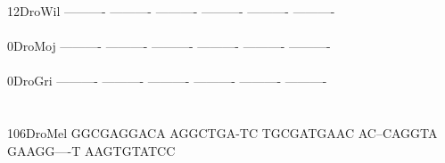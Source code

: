 \documentclass[11pt,twoside,reqno,a4paper]{article}
\begin{document}
{12\hspace*{3\charwidth}DroWil	----------	----------	----------	----------	----------	----------	\\
\hspace*{5\charwidth}\hspace*{7\charwidth}\hspace*{1\charwidth}\hspace*{1\charwidth}\hspace*{1\charwidth}\hspace*{1\charwidth}\hspace*{1\charwidth}\hspace*{1\charwidth}\\
0\hspace*{4\charwidth}DroMoj	----------	----------	----------	----------	----------	----------	\\
\hspace*{5\charwidth}\hspace*{7\charwidth}\hspace*{1\charwidth}\hspace*{1\charwidth}\hspace*{1\charwidth}\hspace*{1\charwidth}\hspace*{1\charwidth}\hspace*{1\charwidth}\\
0\hspace*{4\charwidth}DroGri	----------	----------	----------	----------	----------	----------	\\
\hspace*{5\charwidth}\hspace*{7\charwidth}\hspace*{1\charwidth}\hspace*{1\charwidth}\hspace*{1\charwidth}\hspace*{1\charwidth}\hspace*{1\charwidth}\hspace*{1\charwidth}\\
\\
106\hspace*{2\charwidth}DroMel	GGCGAGGACA	AGGCTGA-TC	TGCGATGAAC	AC--CAGGTA	GAAGG----T	AAGTGTATCC	\\
\hspace*{5\charwidth}\hspace*{7\charwidth}\hspace*{1\charwidth}\hspace*{1\charwidth}\hspace*{1\charwidth}\hspace*{1\charwidth}\hspace*{1\charwidth}\hspace*{1\charwidth}\\
}
\end{document}
